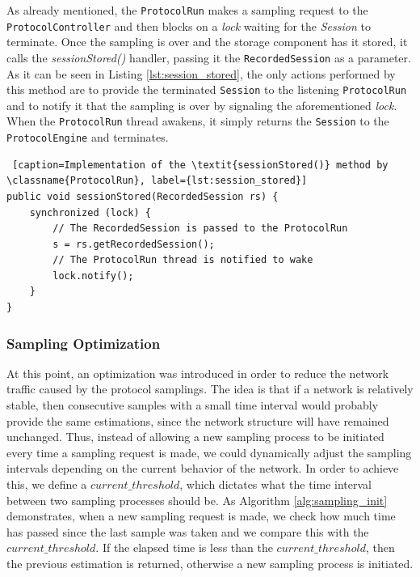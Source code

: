 \documentclass[a4paper,11pt,twoside]{report}
\newcommand{\classname}[1]{\texttt{#1}}
\begin{document}
As already mentioned, the \classname{ProtocolRun} makes a sampling request to the \classname{ProtocolController} and then blocks on a \textit{lock} waiting for the \textit{Session} to terminate. Once the sampling is over and the storage component has it stored, it calls the \textit{sessionStored()} handler, passing it the \classname{RecordedSession} as a parameter. As it can be seen in Listing \ref{lst:session_stored}, the only actions performed by this method are to provide the terminated \classname{Session} to the listening \classname{ProtocolRun} and to notify it that the sampling is over by signaling the aforementioned \textit{lock}. When the \classname{ProtocolRun} thread awakens, it simply returns the \classname{Session} to the \classname{ProtocolEngine} and terminates.  

\begin{lstlisting} [caption=Implementation of the \textit{sessionStored()} method by \classname{ProtocolRun}, label={lst:session_stored}]
public void sessionStored(RecordedSession rs) {
	synchronized (lock) {
		// The RecordedSession is passed to the ProtocolRun
		s = rs.getRecordedSession();
		// The ProtocolRun thread is notified to wake
		lock.notify();
	}
}
\end{lstlisting}

\subsubsection*{Sampling Optimization}

At this point, an optimization was introduced in order to reduce the network traffic caused by the protocol samplings. The idea is that if a network is relatively stable, then consecutive samples with a small time interval would probably provide the same estimations, since the network structure will have remained unchanged. Thus, instead of allowing a new sampling process to be initiated every time a sampling request is made, we could dynamically adjust the sampling intervals depending on the current behavior of the network. In order to achieve this, we define a $current\_threshold$, which dictates what the time interval between two sampling processes should be. As Algorithm \ref{alg:sampling_init} demonstrates, when a new sampling request is made, we check how much time has passed since the last sample was taken and we compare this with the $current\_threshold$. If the elapsed time is less than the $current\_threshold$, then the previous estimation is returned, otherwise a new sampling process is initiated.
\end{document}

